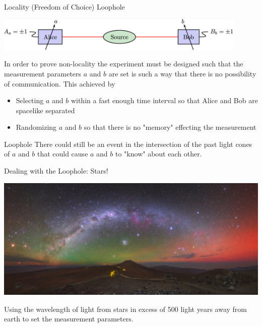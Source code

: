 \documentclass{beamer}
\begin{document}
\begin{frame}{Locality (Freedom of Choice) Loophole}
    \begin{center}
    \includegraphics[width=0.9\textwidth]{Images/EPR.jpg}

    \cite{Larsson2014a}
    \end{center}

    In order to prove non-locality the experiment must be designed such that the measurement parameters $a$ and $b$
    are set is such a way that there is no possibility of communication. This achieved by
    \begin{itemize}
        \item Selecting $a$ and $b$ within a fast enough time interval so that Alice and Bob are spacelike separated
        \item Randomizing $a$ and $b$ so that there is no "memory" effecting the measurement
    \end{itemize}
    \begin{block}{Loophole}
        There could still be an event in the intersection of the past light cones of $a$ and $b$ that could cause $a$ and
        $b$ to "know" about each other.
    \end{block}
\end{frame}

\begin{frame}{Dealing with the Loophole: Stars!}
    \begin{center}
    \includegraphics[width=1.0\textwidth]{Images/Milky_way.jpg}
    \end{center}
    Using the wavelength of light from stars in excess of 500 light years away from earth to set the measurement parameters.

\end{frame}
\end{document}
